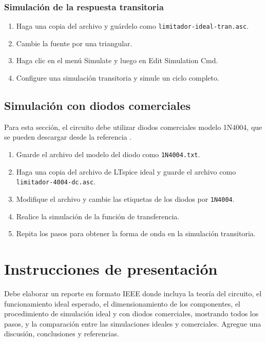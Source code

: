 \documentclass[11pt]{article}
\begin{document}
\subsubsection{Simulación de la respuesta transitoria}

\begin{enumerate}
    \item Haga una copia del archivo y guárdelo como \texttt{limitador-ideal-tran.asc}.
    \item Cambie la fuente por una triangular.
    \item Haga clic en el menú Simulate y luego en Edit Simulation Cmd.
    \item Configure una simulación transitoria y simule un ciclo completo.
\end{enumerate}


\subsection{Simulación con diodos comerciales}

Para esta sección, el circuito debe utilizar diodos comerciales modelo 1N4004, que se pueden descargar desde la referencia \cite{onsemi4004}.

\begin{enumerate}
    \item Guarde el archivo del modelo del diodo como \texttt{1N4004.txt}.
    \item Haga una copia del archivo de LTspice ideal y guarde el archivo como \texttt{limitador-4004-dc.asc}.
    \item Modifique el archivo y cambie las etiquetas de los diodos por \texttt{1N4004}.
    \item Realice la simulación de la función de transferencia.
    \item Repita los pasos para obtener la forma de onda en la simulación transitoria.
\end{enumerate}


\section{Instrucciones de presentación}

Debe elaborar un reporte en formato IEEE donde incluya la teoría del circuito, el funcionamiento ideal esperado, el dimensionamiento de los componentes, el procedimiento de simulación ideal y con diodos comerciales, mostrando todos los pasos, y la comparación entre las simulaciones ideales y comerciales. Agregue una discusión, conclusiones y referencias.
\end{document}
